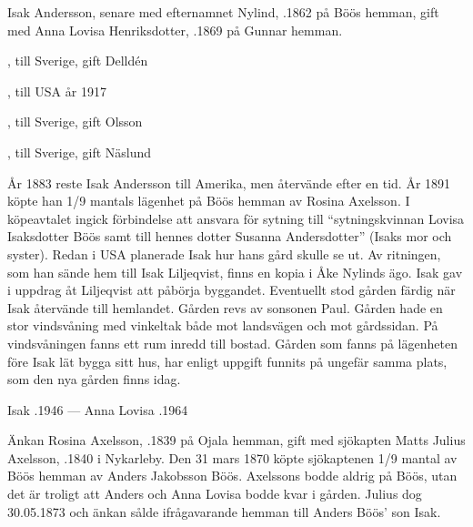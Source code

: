 %
Isak Andersson, senare med efternamnet Nylind, .1862 på Böös hemman, gift med Anna Lovisa Henriksdotter, .1869 på Gunnar hemman.
\begin{jhchildren}
  \item {}, till Sverige, gift Delldén
  \item {}, till USA år 1917
  \item {}
  \item {}
  \item {}
  \item {}
  \item {}, till Sverige, gift Olsson
  \item {}, till Sverige, gift Näslund
\end{jhchildren}
År 1883 reste Isak Andersson till Amerika, men återvände efter en tid. År 1891 köpte han 1/9 mantals lägenhet på Böös hemman av Rosina Axelsson. I köpeavtalet ingick förbindelse att ansvara för sytning till ``sytningskvinnan Lovisa Isaksdotter Böös samt till hennes dotter Susanna Andersdotter'' (Isaks mor och syster). Redan i USA planerade Isak hur hans gård skulle se ut. Av ritningen, som han sände	hem till Isak Liljeqvist, finns en kopia i Åke Nylinds ägo. Isak gav i uppdrag åt Liljeqvist att påbörja byggandet. Eventuellt stod gården	färdig när Isak återvände till hemlandet. Gården revs av sonsonen Paul. Gården hade en stor vindsvåning med vinkeltak både mot landsvägen och mot gårdssidan. På vindsvåningen fanns ett rum inredd till bostad. Gården som fanns på lägenheten före Isak lät bygga sitt hus, har enligt uppgift funnits på ungefär samma plats, som den nya gården finns idag.

Isak .1946  ---  Anna Lovisa .1964


%
Änkan Rosina Axelsson, .1839 på Ojala hemman, gift med sjökapten Matts Julius Axelsson, .1840 i Nykarleby. Den 31 mars 1870 köpte sjökaptenen 1/9 mantal av Böös hemman av Anders Jakobsson Böös. Axelssons bodde aldrig på Böös, utan det är troligt att Anders och Anna Lovisa bodde kvar i gården. Julius dog 30.05.1873 och änkan sålde ifrågavarande hemman till Anders Böös' son Isak.


